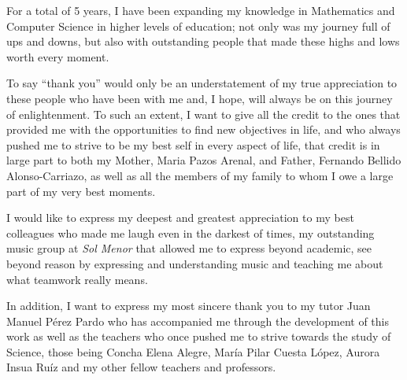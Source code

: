 For a total of 5 years, I have been expanding my knowledge in Mathematics and Computer Science in higher levels of education; not only was my journey full of ups and downs, but also with outstanding people that made these highs and lows worth every moment. 

To say ``thank you'' would only be an understatement of my true appreciation to these people who have been with me and, I hope, will always be on this journey of enlightenment. To such an extent, I want to give all the credit to the ones that provided me with the opportunities to find new objectives in life, and who always pushed me to strive to be my best self in every aspect of life, that credit is in large part to both my Mother, Maria Pazos Arenal, and Father, Fernando Bellido Alonso-Carriazo, as well as all the members of my family to whom I owe a large part of my very best moments.

I would like to express my deepest and greatest appreciation to my best colleagues who made me laugh even in the darkest of times, my outstanding music group at \textit{Sol Menor} that allowed me to express beyond academic, see beyond reason by expressing and understanding music and teaching me about what teamwork really means.

In addition, I want to express my most sincere thank you to my tutor Juan Manuel Pérez Pardo who has accompanied me through the development of this work as well as the teachers who once pushed me to strive towards the study of Science, those being Concha Elena Alegre, María Pilar Cuesta López, Aurora Insua Ruíz and my other fellow teachers and professors.
